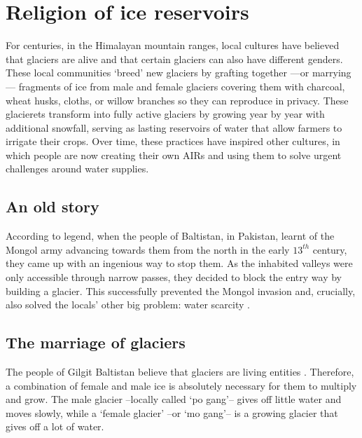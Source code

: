 \chapter{Religion of ice reservoirs}


For centuries, in the Himalayan mountain ranges, local cultures have believed that glaciers are alive and that
certain glaciers can also have different genders. These local communities ‘breed’ new glaciers by grafting
together —or marrying— fragments of ice from male and female glaciers covering them with charcoal, wheat husks,
cloths, or willow branches so they can reproduce in privacy. These glacierets transform into fully active
glaciers by growing year by year with additional snowfall, serving as lasting reservoirs of water that allow
farmers to irrigate their crops. Over time, these practices have inspired other cultures, in which people are
now creating their own \ac{AIRs} and using them to solve urgent challenges around water supplies.

\section{An old story}

According to legend, when the people of Baltistan, in Pakistan, learnt of the Mongol army advancing towards them
from the north in the early $13^{th}$ century, they came up with an ingenious way to stop them. As the inhabited
valleys were only accessible through narrow passes, they decided to block the entry way by building a glacier.
This successfully prevented the Mongol invasion and, crucially, also solved the locals’ other big problem: water
scarcity \citep{khanMarriageGlaciersPrzekroj2020}.

\section{The marriage of glaciers}

The people of Gilgit Baltistan believe that glaciers are living entities
\citep{farazGlacierMarriagesPakistan2020, khanMarriageGlaciersPrzekroj2020}. Therefore, a combination of female
and male ice is absolutely necessary for them to multiply and grow. The male glacier –locally called ‘po gang’–
gives off little water and moves slowly, while a ‘female glacier’ –or ‘mo gang’– is a growing glacier that gives
off a lot of water. 

